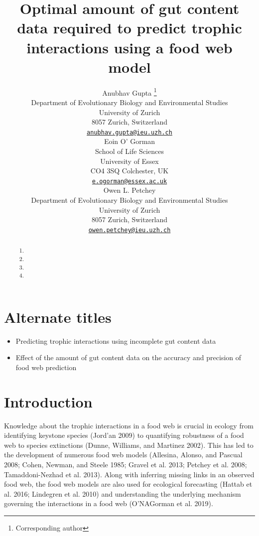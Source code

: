 \documentclass{article}
\title{Optimal amount of gut content data required to predict trophic
interactions using a food web model}
\author{
    Anubhav Gupta
    \thanks{Corresponding author}
   \\
    Department of Evolutionary Biology and Environmental Studies \\
    University of Zurich \\
  8057 Zurich, Switzerland \\
  \texttt{\href{mailto:anubhav.gupta@ieu.uzh.ch}{\nolinkurl{anubhav.gupta@ieu.uzh.ch}}} \\
   \And
    Eoin O' Gorman
   \\
    School of Life Sciences \\
    University of Essex \\
  CO4 3SQ Colchester, UK \\
  \texttt{\href{mailto:e.ogorman@essex.ac.uk}{\nolinkurl{e.ogorman@essex.ac.uk}}} \\
   \And
    Owen L. Petchey
   \\
    Department of Evolutionary Biology and Environmental Studies \\
    University of Zurich \\
  8057 Zurich, Switzerland \\
  \texttt{\href{mailto:owen.petchey@ieu.uzh.ch}{\nolinkurl{owen.petchey@ieu.uzh.ch}}} \\
  }
\begin{document}
\maketitle

\def\tightlist{}


\begin{abstract}
\begin{enumerate}
\def\labelenumi{\arabic{enumi})}
\tightlist
\item
\item
\item
\item
\end{enumerate}
\end{abstract}


\hypertarget{alternate-titles}{%
\section{Alternate titles}\label{alternate-titles}}

\begin{itemize}
\item
  Predicting trophic interactions using incomplete gut content data
\item
  Effect of the amount of gut content data on the accuracy and precision
  of food web prediction
\end{itemize}

\hypertarget{introduction}{%
\section{Introduction}\label{introduction}}

Knowledge about the trophic interactions in a food web is crucial in
ecology from identifying keystone species (Jord'an 2009) to quantifying
robustness of a food web to species extinctions (Dunne, Williams, and
Martinez 2002). This has led to the development of numerous food web
models (Allesina, Alonso, and Pascual 2008; Cohen, Newman, and Steele
1985; Gravel et al. 2013; Petchey et al. 2008; Tamaddoni-Nezhad et al.
2013). Along with inferring missing links in an observed food web, the
food web models are also used for ecological forecasting (Hattab et al.
2016; Lindegren et al. 2010) and understanding the underlying mechanism
governing the interactions in a food web (O'NAGorman et al. 2019).
\end{document}
